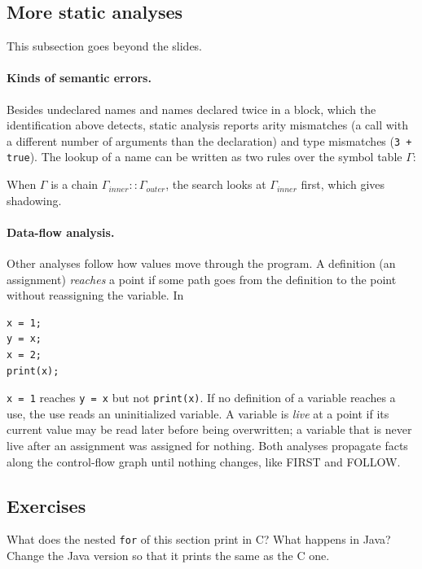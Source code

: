 \subsection{More static analyses}

This subsection goes beyond the slides.

\paragraph{Kinds of semantic errors.} Besides undeclared names and names
declared twice in a block, which the identification above detects, static
analysis reports arity mismatches (a call with a different number of
arguments than the declaration) and type mismatches (\texttt{3 + true}). The
lookup of a name can be written as two rules over the symbol table $\Gamma$:
When $\Gamma$ is a chain $\Gamma_{\mathit{inner}} :: \Gamma_{\mathit{outer}}$, the search
looks at $\Gamma_{\mathit{inner}}$ first, which gives shadowing.

\paragraph{Data-flow analysis.} Other analyses follow how values move through
the program. A definition (an assignment) \emph{reaches} a point if some path
goes from the definition to the point without reassigning the variable. In
\begin{lstlisting}
x = 1;
y = x;
x = 2;
print(x);
\end{lstlisting}
\texttt{x = 1} reaches \texttt{y = x} but not \texttt{print(x)}. If no definition
of a variable reaches a use, the use reads an uninitialized variable. A
variable is \emph{live} at a point if its current value may be read later
before being overwritten; a variable that is never live after an assignment
was assigned for nothing. Both analyses propagate facts along the
control-flow graph until nothing changes, like FIRST and FOLLOW.

\subsection{Exercises}

\begin{exercise}
What does the nested \texttt{for} of this section print in C? What happens in
Java? Change the Java version so that it prints the same as the C one.
\end{exercise}

